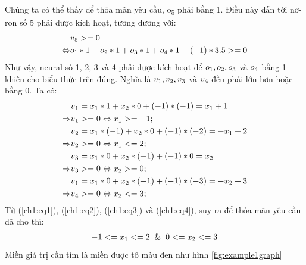 \begin{answ}
Chúng ta có thể thấy để thỏa mãn yêu cầu, o\textsubscript{5} phải bằng 1. Điều này dẫn tới nơ-ron số 5 phải được kích hoạt, tương đương với:
\begin{align*}
&v\textsubscript{5} >= 0 \\
\Leftrightarrow &o\textsubscript{1} * 1 + o\textsubscript{2} * 1 + o\textsubscript{3} * 1 + o\textsubscript{4} * 1 + (-1) * 3.5 >= 0
\end{align*}
Như vậy, neural số 1, 2, 3 và 4 phải được kích hoạt để $o\textsubscript{1}, o\textsubscript{2}, o\textsubscript{3}$ và $o\textsubscript{4}$ bằng 1 khiến cho biểu thức trên đúng. Nghĩa là $v\textsubscript{1}, v\textsubscript{2}, v\textsubscript{3}$ và $v\textsubscript{4}$ đều phải lớn hơn hoặc bằng 0. Ta có:
\begin{align}
  &v\textsubscript{1} = x\textsubscript{1} * 1 + x\textsubscript{2} * 0 + (-1) * (-1) = x\textsubscript{1} + 1 \nonumber \\
  \Rightarrow &v\textsubscript{1} >= 0 \Leftrightarrow  x\textsubscript{1} >= -1;  \label{ch1:eq1} \\
  &v\textsubscript{2} = x\textsubscript{1} * (-1) + x\textsubscript{2} * 0 + (-1) * (-2) = -x\textsubscript{1} + 2 \nonumber \\
    \Rightarrow &v\textsubscript{2} >= 0 \Leftrightarrow  x\textsubscript{1} <= 2;  \label{ch1:eq2} \\
  &v\textsubscript{3} = x\textsubscript{1} * 0 + x\textsubscript{2} * (-1) + (-1) * 0 = x\textsubscript{2} \nonumber \\
    \Rightarrow &v\textsubscript{3} >= 0 \Leftrightarrow  x\textsubscript{2} >= 0;  \label{ch1:eq3} \\
  &v\textsubscript{1} = x\textsubscript{1} * 0 + x\textsubscript{2} * (-1) + (-1) * (-3) = -x\textsubscript{2} + 3 \nonumber \\
    \Rightarrow &v\textsubscript{4} >= 0 \Leftrightarrow  x\textsubscript{2} <= 3;  \label{ch1:eq4}
\end{align}
\noindent Từ (\ref{ch1:eq1}), (\ref{ch1:eq2}), (\ref{ch1:eq3}) và (\ref{ch1:eq4}), suy ra để thỏa mãn yêu cầu đã cho thì:
\begin{align*}
-1 <= x\textsubscript{1} <= 2 \And 0 <= x\textsubscript{2} <= 3
\end{align*}
Miền giá trị cần tìm là miền được tô màu đen như hình \ref{fig:example1graph}
\begin{figure}[h]
	\centering

\end{figure}
\end{answ}
